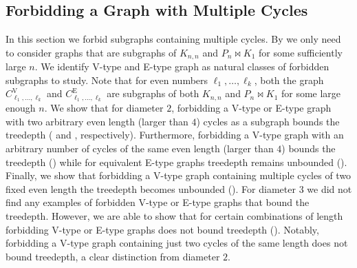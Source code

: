 \documentclass[runningheads,envcountsame]{llncs}
\newcommand{\sharedVertex}[1]{C^{\mathrm{V}}_{#1}}
\newcommand{\sharedEdge}[1]{C^{\mathrm{E}}_{#1}}
\newcommand{\join}{\bowtie}
\begin{document}
\subsection{Forbidding a Graph with Multiple Cycles}\label{sec:subgraphmult}
In this section we forbid subgraphs containing multiple cycles. By  we only need to consider graphs that are subgraphs of $K_{n,n}$ and $P_n \bowtie K_1$ for some sufficiently large $n$. We identify V-type and E-type graph as natural classes of forbidden subgraphs to study.
Note that for even numbers $\ell_1,\dots,\ell_k$,
both the graph $\sharedVertex{\ell_1,\dots,\ell_k}$ and $\sharedEdge{\ell_1,\dots,\ell_k}$ are subgraphs of both $K_{n,n}$ and $P_n\join K_1$ for some large enough $n$.
We show that for diameter $2$, forbidding a V-type or E-type graph with two arbitrary even length (larger than $4$) cycles  as a subgraph bounds the treedepth ( and , respectively). Furthermore, forbidding a V-type graph with an arbitrary number of cycles of the same even length (larger than $4$) bounds the treedepth () while for equivalent E-type graphs treedepth remains unbounded (). Finally, we show that forbidding a V-type graph containing multiple cycles of two fixed even length the treedepth becomes unbounded ().
For diameter $3$ we did not find any examples of forbidden V-type or E-type graphs that bound the treedepth. However, we are able to show that for certain combinations of length forbidding V-type or E-type graphs does not bound treedepth (). Notably, forbidding a V-type graph containing just two cycles of the same length does not bound treedepth, a clear distinction from diameter $2$.
\end{document}
